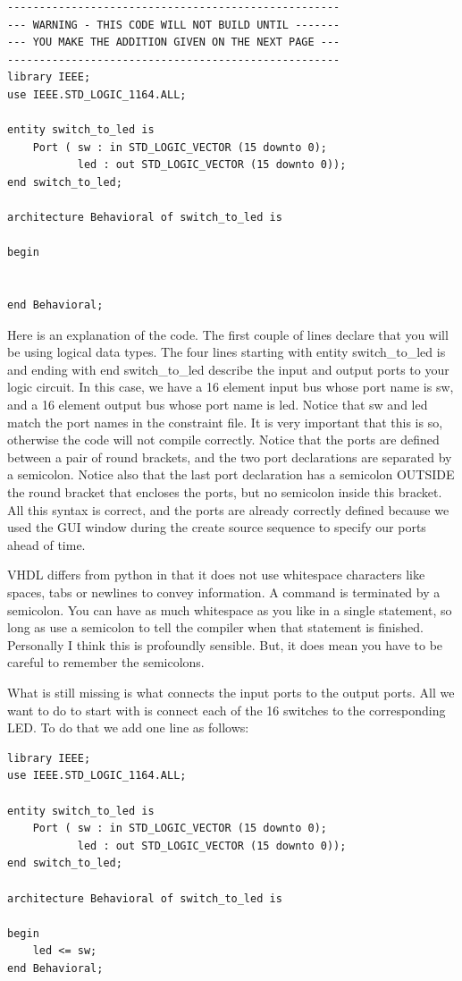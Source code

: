 \documentclass[../physical_computing.tex]{subfiles}
\begin{document}
\begin{verbatim}
----------------------------------------------------
--- WARNING - THIS CODE WILL NOT BUILD UNTIL -------
--- YOU MAKE THE ADDITION GIVEN ON THE NEXT PAGE ---
----------------------------------------------------
library IEEE;
use IEEE.STD_LOGIC_1164.ALL;

entity switch_to_led is
    Port ( sw : in STD_LOGIC_VECTOR (15 downto 0);
           led : out STD_LOGIC_VECTOR (15 downto 0));
end switch_to_led;

architecture Behavioral of switch_to_led is

begin


end Behavioral;
\end{verbatim}

Here is an explanation of the code. The first couple of lines declare that you will be using logical data types. The four lines starting with entity switch\_to\_led is and ending with end switch\_to\_led describe the input and output ports to your logic circuit. In this case, we have a 16 element input bus whose port name is sw, and a 16 element output bus whose port name is led. Notice that sw and led match the port names in the constraint file. It is very important that this is so, otherwise the code will not compile correctly. Notice that the ports are defined between a pair of round brackets, and the two port declarations are separated by a semicolon. Notice also that the last port declaration has a semicolon OUTSIDE the round bracket that encloses the ports, but no semicolon inside this bracket. All this syntax is correct, and the ports are already correctly defined because we used the GUI window during the create source sequence to specify our ports ahead of time.

VHDL differs from python in that it does not use whitespace characters like spaces, tabs or newlines to convey information. A command is terminated by a semicolon. You can have as much whitespace as you like in a single statement, so long as use a semicolon to tell the compiler when that statement is finished. Personally I think this is profoundly sensible. But, it does mean you have to be careful to remember the semicolons.

What is still missing is what connects the input ports to the output ports. All we want to do to start with is connect each of the 16 switches to the corresponding LED. To do that we add one line as follows:

\newpage

\begin{verbatim}
library IEEE;
use IEEE.STD_LOGIC_1164.ALL;

entity switch_to_led is
    Port ( sw : in STD_LOGIC_VECTOR (15 downto 0);
           led : out STD_LOGIC_VECTOR (15 downto 0));
end switch_to_led;

architecture Behavioral of switch_to_led is

begin
    led <= sw;
end Behavioral;
\end{verbatim}
\end{document}
